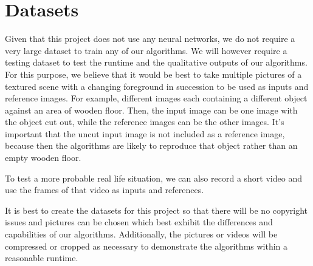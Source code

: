 \section{Datasets}
\label{sec:datasets}

Given that this project does not use any neural networks, we do not require a very large dataset to train any of our algorithms. We will however require a testing dataset to test the runtime and the qualitative outputs of our algorithms. For this purpose, we believe that it would be best to take multiple pictures of a textured scene with a changing foreground in succession to be used as inputs and reference images. For example, different images each containing a different object against an area of wooden floor. Then, the input image can be one image with the object cut out, while the reference images can be the other images. It's important that the uncut input image is not included as a reference image, because then the algorithms are likely to reproduce that object rather than an empty wooden floor.

To test a more probable real life situation, we can also record a short video and use the frames of that video as inputs and references.

It is best to create the datasets for this project so that there will be no copyright issues and pictures can be chosen which best exhibit the differences and capabilities of our algorithms. Additionally, the pictures or videos will be compressed or cropped as necessary to demonstrate the algorithms within a reasonable runtime.